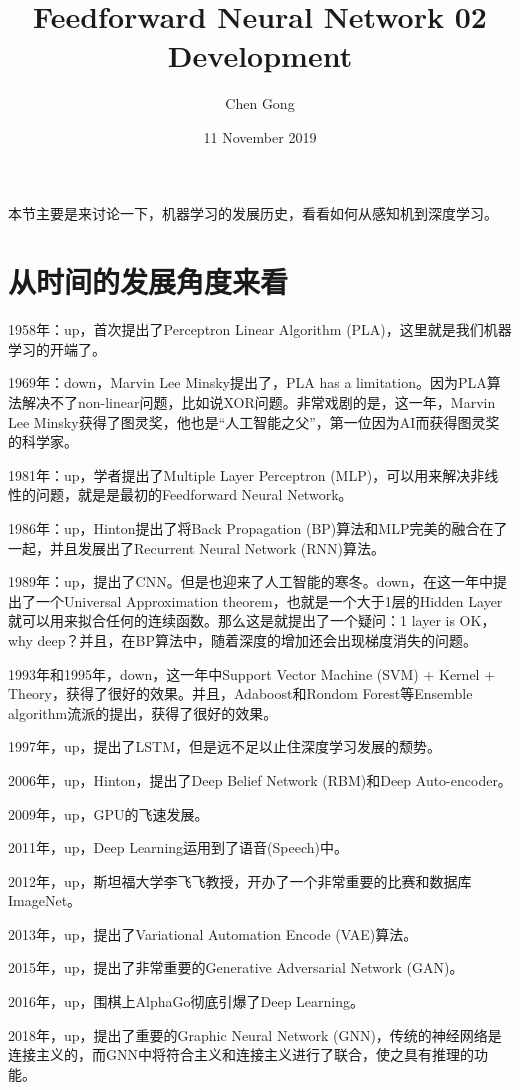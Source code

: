 \documentclass[a4paper]{article}
\title{Feedforward Neural Network 02 Development}
\author{Chen Gong}
\date{11 November 2019}
\begin{document}
\maketitle
本节主要是来讨论一下，机器学习的发展历史，看看如何从感知机到深度学习。
\section{从时间的发展角度来看}

1958年：up，首次提出了Perceptron Linear Algorithm (PLA)，这里就是我们机器学习的开端了。

1969年：down，Marvin Lee Minsky提出了，PLA has a limitation。因为PLA算法解决不了non-linear问题，比如说XOR问题。非常戏剧的是，这一年，Marvin Lee Minsky获得了图灵奖，他也是“人工智能之父”，第一位因为AI而获得图灵奖的科学家。

1981年：up，学者提出了Multiple Layer Perceptron (MLP)，可以用来解决非线性的问题，就是是最初的Feedforward Neural Network。

1986年：up，Hinton提出了将Back Propagation (BP)算法和MLP完美的融合在了一起，并且发展出了Recurrent Neural Network (RNN)算法。

1989年：up，提出了CNN。但是也迎来了人工智能的寒冬。down，在这一年中提出了一个Universal Approximation theorem，也就是一个大于1层的Hidden Layer就可以用来拟合任何的连续函数。那么这是就提出了一个疑问：1 layer is OK，why deep？并且，在BP算法中，随着深度的增加还会出现梯度消失的问题。

1993年和1995年，down，这一年中Support Vector Machine (SVM) + Kernel + Theory，获得了很好的效果。并且，Adaboost和Rondom Forest等Ensemble algorithm流派的提出，获得了很好的效果。

1997年，up，提出了LSTM，但是远不足以止住深度学习发展的颓势。

2006年，up，Hinton，提出了Deep Belief Network (RBM)和Deep Auto-encoder。

2009年，up，GPU的飞速发展。

2011年，up，Deep Learning运用到了语音(Speech)中。

2012年，up，斯坦福大学李飞飞教授，开办了一个非常重要的比赛和数据库ImageNet。

2013年，up，提出了Variational Automation Encode (VAE)算法。

2015年，up，提出了非常重要的Generative Adversarial Network (GAN)。

2016年，up，围棋上AlphaGo彻底引爆了Deep Learning。

2018年，up，提出了重要的Graphic Neural Network (GNN)，传统的神经网络是连接主义的，而GNN中将符合主义和连接主义进行了联合，使之具有推理的功能。
\end{document}
